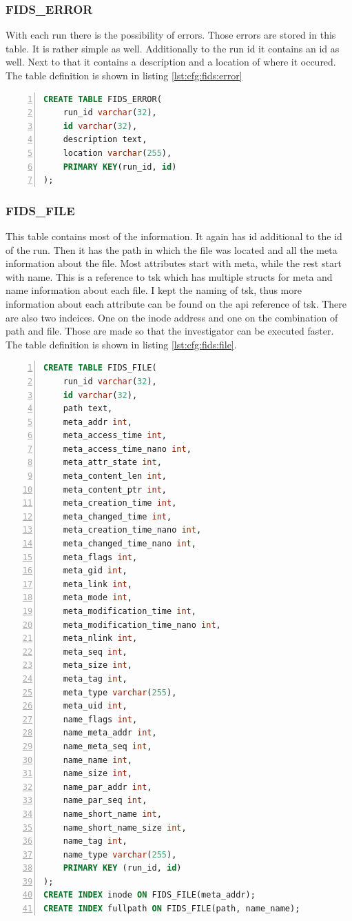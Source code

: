 \subsubsection{FIDS\_ERROR}

With each run there is the possibility of errors. Those errors are stored in this table. It is rather simple as well. Additionally to the run \gls{id} it contains an \gls{id} as well. Next to that it contains a description and a location of where it occured. The table definition is shown in listing \ref{lst:cfg:fids:error}

\begin{lstlisting}[language=sql, numbers=left, caption=Fids Error Table Definition, label=lst:cfg:fids:error]
CREATE TABLE FIDS_ERROR(
	run_id varchar(32), 
	id varchar(32), 
	description text, 
	location varchar(255), 
	PRIMARY KEY(run_id, id)
);
\end{lstlisting}

\subsubsection{FIDS\_FILE}

This table contains most of the information. It again has \gls{id} additional to the \gls{id} of the run. Then it has the path in which the file was located and all the meta information about the file. Most attributes start with meta, while the rest start with name. This is a reference to \gls{tsk} which has multiple structs for meta and name information about each file. I kept the naming of \gls{tsk}, thus more information about each attribute can be found on the \gls{api} reference of \gls{tsk}. There are also two indeices. One on the inode address and one on the combination of path and file. Those are made so that the investigator can be executed faster. \cite{tsk:file:struct} The table definition is shown in listing \ref{lst:cfg:fids:file}.

\begin{lstlisting}[language=sql, numbers=left, caption=Fids File Table Definition, label=lst:cfg:fids:file]
CREATE TABLE FIDS_FILE(
	run_id varchar(32),
	id varchar(32),
	path text, 
	meta_addr int,
	meta_access_time int,
	meta_access_time_nano int,
	meta_attr_state int,
	meta_content_len int,
	meta_content_ptr int,
	meta_creation_time int,
	meta_changed_time int,
	meta_creation_time_nano int,
	meta_changed_time_nano int,
	meta_flags int,
	meta_gid int,
	meta_link int,
	meta_mode int,
	meta_modification_time int,
	meta_modification_time_nano int,
	meta_nlink int,
	meta_seq int,
	meta_size int,
	meta_tag int,
	meta_type varchar(255),
	meta_uid int,
	name_flags int,
	name_meta_addr int,
	name_meta_seq int,
	name_name int,
	name_size int,
	name_par_addr int,
	name_par_seq int,
	name_short_name int,
	name_short_name_size int,
	name_tag int,
	name_type varchar(255),
	PRIMARY KEY (run_id, id)
);
CREATE INDEX inode ON FIDS_FILE(meta_addr);
CREATE INDEX fullpath ON FIDS_FILE(path, name_name);
\end{lstlisting}


